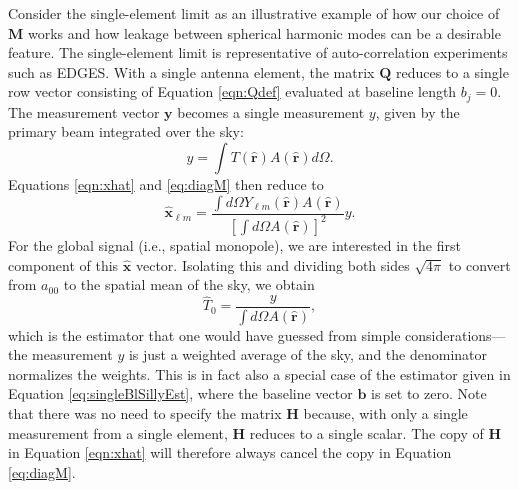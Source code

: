 \documentclass[twocolumn,apj,numberedappendix]{emulateapj}
\newcommand{\Hmat}{\mathbf{H}}
\newcommand{\M}{\mathbf{M}}
\begin{document}
Consider the single-element limit as an illustrative example of how our choice of $\M$ works and how leakage between spherical harmonic modes can be a desirable feature. The single-element limit is representative of auto-correlation experiments such as EDGES. With a single antenna element, the matrix $\mathbf{Q}$ reduces to a single row vector consisting of Equation \eqref{eqn:Qdef} evaluated at baseline length $b_j=0$. The measurement vector $\mathbf{y}$ becomes a single measurement $y$, given by the primary beam integrated over the sky:
\begin{equation}
y = \int T(\mathbf{\hat{r}}) A(\mathbf{\hat{r}}) d\Omega.
\end{equation}
Equations \eqref{eqn:xhat} and \eqref{eq:diagM} then reduce to
\begin{equation}
\mathbf{\hat{x}}_{\ell m} = \frac{\int d\Omega Y_{\ell m} (\mathbf{\hat{r}}) A(\mathbf{\hat{r}})}{\left[ \int d\Omega A(\mathbf{\hat{r}}) \right]^2} y.
\end{equation}
For the global signal (i.e., spatial monopole), we are interested in the first component of this $\mathbf{\hat{x}}$ vector. Isolating this and dividing both sides $\sqrt{4\pi}$ to convert from $a_{00}$ to the spatial mean of the sky, we obtain
\begin{equation}
\label{eq:singleElementExtraction}
\widehat{T}_0 = \frac{y}{ \int d\Omega A(\mathbf{\hat{r}}) },
\end{equation}
which is the estimator that one would have guessed from simple considerations---the measurement $y$ is just a weighted average of the sky, and the denominator normalizes the weights. This is in fact also a special case of the estimator given in Equation \eqref{eq:singleBlSillyEst}, where the baseline vector $\mathbf{b}$ is set to zero. Note that there was no need to specify the matrix $\Hmat$ because, with only a single measurement from a single element, $\Hmat$ reduces to a single scalar. The copy of $\Hmat$ in Equation \eqref{eqn:xhat} will therefore always cancel the copy in Equation \eqref{eq:diagM}.
%
\end{document}
